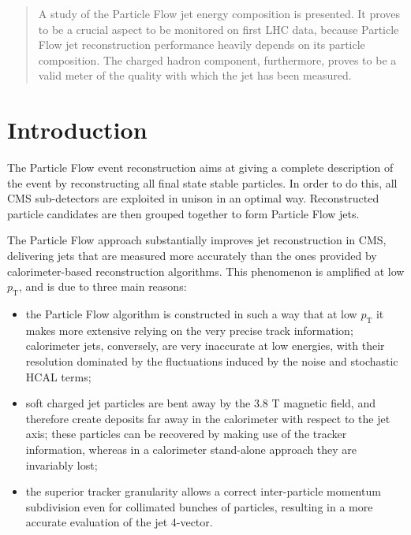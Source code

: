 \documentclass{cmspaper}
\begin{document}
\begin{titlepage}
%
\begin{abstract}
A study of the Particle Flow jet energy composition is presented. It proves to be a crucial aspect to be monitored on first LHC data, because Particle Flow jet reconstruction performance heavily depends on its particle composition. The charged hadron component, furthermore, proves to be a valid meter of the quality with which the jet has been measured.
\end{abstract} 
\end{titlepage}
\tableofcontents
\newpage


\section{Introduction}

The Particle Flow event reconstruction \cite{pflow} aims at giving a complete description of the event by reconstructing all final state stable particles. In order to do this, all CMS sub-detectors are exploited in unison in an optimal way. Reconstructed particle candidates are then grouped together to form Particle Flow jets.

The Particle Flow approach substantially improves jet reconstruction in CMS, delivering jets that are measured more accurately than the ones provided by calorimeter-based reconstruction algorithms. This phenomenon is amplified at low $p_{\mathrm{T}}$, and is due to three main reasons:
\begin{itemize}
\item the Particle Flow algorithm is constructed in such a way that at low $p_{\mathrm{T}}$ it makes more extensive relying on the very precise track information; calorimeter jets, conversely, are very inaccurate at low energies, with their resolution dominated by the fluctuations induced by the noise and stochastic HCAL terms;
\item soft charged jet particles are bent away by the 3.8 T magnetic field, and therefore create deposits far away in the calorimeter with respect to the jet axis; these particles can be recovered by making use of the tracker information, whereas in a calorimeter stand-alone approach they are invariably lost;
\item the superior tracker granularity allows a correct inter-particle momentum subdivision even for collimated bunches of particles, resulting in a more accurate evaluation of the jet 4-vector.
\end{itemize}
\end{document}
